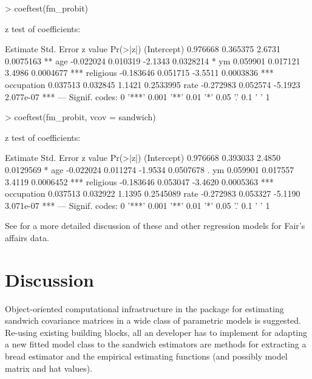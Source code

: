 \documentclass{Z}
\begin{document}
\begin{Schunk}
\begin{Sinput}
> coeftest(fm_probit)
\end{Sinput}
\begin{Soutput}
z test of coefficients:

             Estimate Std. Error z value  Pr(>|z|)    
(Intercept)  0.976668   0.365375  2.6731 0.0075163 ** 
age         -0.022024   0.010319 -2.1343 0.0328214 *  
ym           0.059901   0.017121  3.4986 0.0004677 ***
religious   -0.183646   0.051715 -3.5511 0.0003836 ***
occupation   0.037513   0.032845  1.1421 0.2533995    
rate        -0.272983   0.052574 -5.1923 2.077e-07 ***
---
Signif. codes:  0 '***' 0.001 '**' 0.01 '*' 0.05 '.' 0.1 ' ' 1 
\end{Soutput}
\begin{Sinput}
> coeftest(fm_probit, vcov = sandwich)
\end{Sinput}
\begin{Soutput}
z test of coefficients:

             Estimate Std. Error z value  Pr(>|z|)    
(Intercept)  0.976668   0.393033  2.4850 0.0129569 *  
age         -0.022024   0.011274 -1.9534 0.0507678 .  
ym           0.059901   0.017557  3.4119 0.0006452 ***
religious   -0.183646   0.053047 -3.4620 0.0005363 ***
occupation   0.037513   0.032922  1.1395 0.2545089    
rate        -0.272983   0.053327 -5.1190 3.071e-07 ***
---
Signif. codes:  0 '***' 0.001 '**' 0.01 '*' 0.05 '.' 0.1 ' ' 1 
\end{Soutput}
\end{Schunk}

See \cite{hac:Greene:2003} for a more detailed discussion of these and other
regression models for Fair's affairs data.


\section{Discussion} \label{sec:disc}

Object-oriented computational infrastructure in the  package 
for estimating sandwich covariance matrices in a wide class of parametric models is suggested.
Re-using existing building blocks, all an  developer has to implement for adapting
a new fitted model class to the sandwich estimators are methods for extracting a bread
estimator and the empirical estimating functions (and possibly model matrix and hat values).
\end{document}
